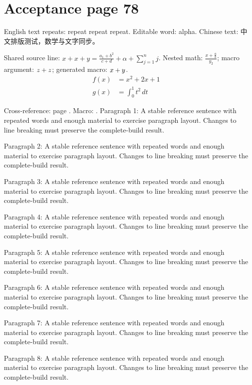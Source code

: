 \section*{Acceptance page 78}
\label{page:78}
English text repeats: repeat repeat repeat. Editable word: alpha.
Chinese text: 中文排版测试，数学与文字同步。\par
Shared source line: $x+x+y=\frac{a_{1}+b^{2}}{c+d}+\alpha+\sum_{j=1}^{n}j$.
Nested math: $\frac{x+\frac{a}{b}}{y_{2}}$; macro argument: $z+z$; generated macro: $x+y$.
\begin{align*}
 f(x)&=x^{2}+2x+1\\
 g(x)&=\int_{0}^{1} t^{2}\,dt
\end{align*}
\par Cross-reference: page \pageref{page:1}. Macro: \globalword.
Paragraph 1: A stable reference sentence with repeated words and enough material to exercise paragraph layout. Changes to line breaking must preserve the complete-build result.\par
Paragraph 2: A stable reference sentence with repeated words and enough material to exercise paragraph layout. Changes to line breaking must preserve the complete-build result.\par
Paragraph 3: A stable reference sentence with repeated words and enough material to exercise paragraph layout. Changes to line breaking must preserve the complete-build result.\par
Paragraph 4: A stable reference sentence with repeated words and enough material to exercise paragraph layout. Changes to line breaking must preserve the complete-build result.\par
Paragraph 5: A stable reference sentence with repeated words and enough material to exercise paragraph layout. Changes to line breaking must preserve the complete-build result.\par
Paragraph 6: A stable reference sentence with repeated words and enough material to exercise paragraph layout. Changes to line breaking must preserve the complete-build result.\par
Paragraph 7: A stable reference sentence with repeated words and enough material to exercise paragraph layout. Changes to line breaking must preserve the complete-build result.\par
Paragraph 8: A stable reference sentence with repeated words and enough material to exercise paragraph layout. Changes to line breaking must preserve the complete-build result.\par
\newpage
